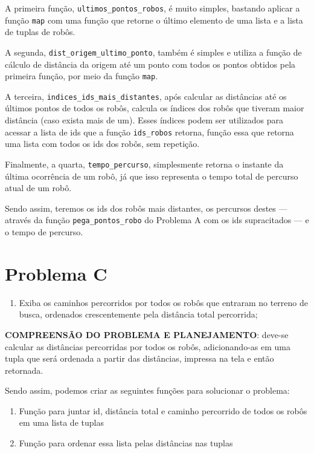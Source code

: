 A primeira função, \texttt{ultimos\_pontos\_robos}, é muito simples, bastando aplicar a função \texttt{map} com uma função que retorne o último elemento de uma lista e a lista de tuplas de robôs.

A segunda, \texttt{dist\_origem\_ultimo\_ponto}, também é simples e utiliza a função de cálculo de distância da origem até um ponto com todos os pontos obtidos pela primeira função, por meio da função \texttt{map}.

A terceira, \texttt{indices\_ids\_mais\_distantes}, após calcular as distâncias até os últimos pontos de todos os robôs, calcula os índices dos robôs que tiveram maior distância (caso exista mais de um). Esses índices podem ser utilizados para acessar a lista de ids que a função \texttt{ids\_robos} retorna, função essa que retorna uma lista com todos os ids dos robôs, sem repetição.

Finalmente, a quarta, \texttt{tempo\_percurso}, simplesmente retorna o instante da última ocorrência de um robô, já que isso representa o tempo total de percurso atual de um robô.

Sendo assim, teremos os ids dos robôs mais distantes, os percursos destes --- através da função \texttt{pega\_pontos\_robo} do Problema A com os ids supracitados --- e o tempo de percurso.


\section{Problema C}\label{problemaC}

\begin{enumerate}[label=\textbf{\alph*)},resume*=problemas]
\item Exiba os caminhos percorridos por todos os robôs que entraram no terreno de busca, ordenados crescentemente pela distância total percorrida;
\end{enumerate}

\noindent \textbf{COMPREENSÃO DO PROBLEMA E PLANEJAMENTO}: deve-se calcular as distâncias percorridas por todos os robôs, adicionando-as em uma tupla que será ordenada a partir das distâncias, impressa na tela e então retornada.

Sendo assim, podemos criar as seguintes funções para solucionar o problema:
\begin{enumerate}
\item Função para juntar id, distância total e caminho percorrido de todos os robôs em uma lista de tuplas
\item Função para ordenar essa lista pelas distâncias nas tuplas
\end{enumerate}

